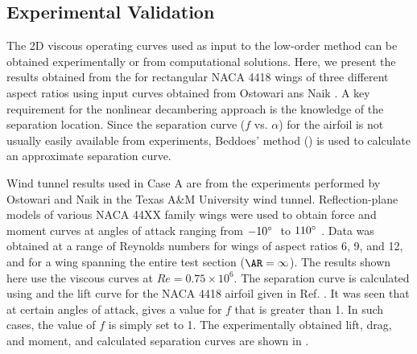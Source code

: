 \subsection{Experimental Validation}
\label{sec:exp-results}
The 2D viscous operating curves used as input to the low-order method can be obtained experimentally or from computational solutions. Here, we present the results obtained from the \methodname for rectangular NACA 4418 wings of three different aspect ratios using input curves obtained from Ostowari ans Naik \cite{naik_ostowari_nrel}.
A key requirement for the nonlinear decambering approach is the knowledge of the separation location. Since the separation curve ($f$ vs. $\alpha$) for the airfoil is not usually easily available from experiments, Beddoes' method () is used to calculate an approximate separation curve.



Wind tunnel results used in Case A are from the experiments  performed by Ostowari and Naik \cite{naik_ostowari_nrel} in the Texas A\&M University wind tunnel. Reflection-plane models of various NACA 44XX family wings were used to obtain force and moment curves at angles of attack ranging from $-10^\circ ~{}$ to $110^\circ ~{}$.
Data was obtained at a range of Reynolds numbers for wings of aspect ratios 6, 9, and 12, and for a wing spanning the entire test section ($\ar = \infty$). The results shown here use the viscous curves at $Re = 0.75\times10^6$. The separation curve is calculated using  and the lift curve for the NACA 4418 airfoil given in Ref. \cite{naik_ostowari_nrel}.
It was seen that at certain angles of attack,  gives a value for $f$ that is greater than 1.
In such cases, the value of $f$ is simply set to 1. The experimentally obtained lift, drag, and moment, and calculated separation curves are shown in .

